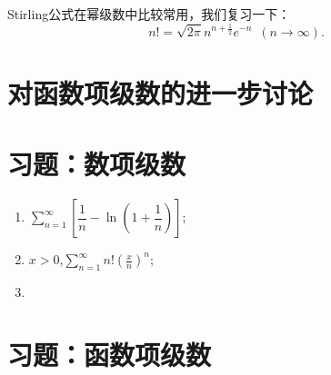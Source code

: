 Stirling公式在幂级数中比较常用，我们复习一下：
\[n!=\sqrt{2\pi}n^{n+\frac{1}{2}}e^{-n}\enspace (n\to\infty).\]
\section{对函数项级数的进一步讨论}

\section{习题：数项级数}
\begin{exercise}[判断下列正项级数的敛散性]
    \begin{enumerate}
        \item \(\displaystyle\sum\limits_{n=1}^{\infty}\left[\dfrac{1}{n}-\ln(1+\dfrac{1}{n})\right]\);
        \item \(x>0\),\enspace  \(\displaystyle\sum\limits_{n=1}^{\infty}n!(\frac{x}{n})^n\);
        \item 
    \end{enumerate}
\end{exercise}
\section{习题：函数项级数}